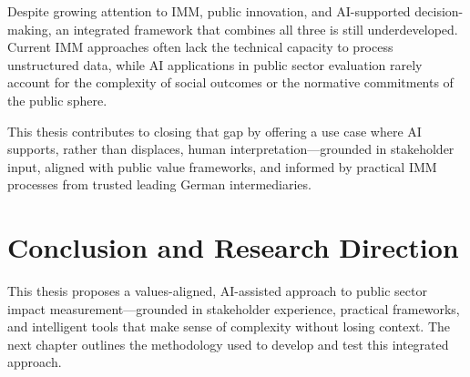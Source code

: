 Despite growing attention to IMM, public innovation, and AI-supported decision-making, an integrated framework that combines all three is still underdeveloped.
Current IMM approaches often lack the technical capacity to process unstructured data, while AI applications in public sector evaluation rarely account for the complexity of social outcomes or the normative commitments of the public sphere.

This thesis contributes to closing that gap by offering a use case where AI supports, rather than displaces, human interpretation—grounded in stakeholder input, aligned with public value frameworks, and informed by practical IMM processes from trusted leading German intermediaries.

\section{Conclusion and Research Direction}\label{sec:conclusion-and-research-direction}


This thesis proposes a values-aligned, AI-assisted approach to public sector impact measurement—grounded in stakeholder experience, practical frameworks, and intelligent tools that make sense of complexity without losing context.
The next chapter outlines the methodology used to develop and test this integrated approach.
